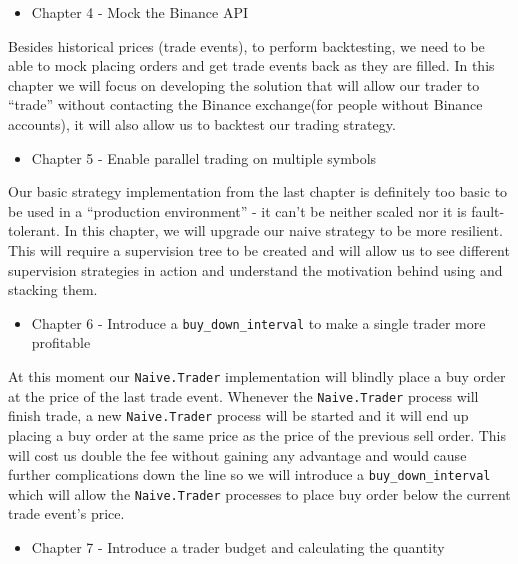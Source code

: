 \documentclass[
]{book}
\providecommand{\tightlist}{%
  \setlength{\itemsep}{0pt}\setlength{\parskip}{0pt}}
\begin{document}
\begin{itemize}
\tightlist
\item
  Chapter 4 - Mock the Binance API
\end{itemize}

Besides historical prices (trade events), to perform backtesting, we need to be able to mock placing orders and get trade events back as they are filled. In this chapter we will focus on developing the solution that will allow our trader to ``trade'' without contacting the Binance exchange(for people without Binance accounts), it will also allow us to backtest our trading strategy.

\begin{itemize}
\tightlist
\item
  Chapter 5 - Enable parallel trading on multiple symbols
\end{itemize}

Our basic strategy implementation from the last chapter is definitely too basic to be used in a ``production environment'' - it can't be neither scaled nor it is fault-tolerant. In this chapter, we will upgrade our naive strategy to be more resilient. This will require a supervision tree to be created and will allow us to see different supervision strategies in action and understand the motivation behind using and stacking them.

\begin{itemize}
\tightlist
\item
  Chapter 6 - Introduce a \texttt{buy\_down\_interval} to make a single trader more profitable
\end{itemize}

At this moment our \texttt{Naive.Trader} implementation will blindly place a buy order at the price of the last trade event. Whenever the \texttt{Naive.Trader} process will finish trade, a new \texttt{Naive.Trader} process will be started and it will end up placing a buy order at the same price as the price of the previous sell order. This will cost us double the fee without gaining any advantage and would cause further complications down the line so we will introduce a \texttt{buy\_down\_interval} which will allow the \texttt{Naive.Trader} processes to place buy order below the current trade event's price.

\begin{itemize}
\tightlist
\item
  Chapter 7 - Introduce a trader budget and calculating the quantity
\end{itemize}
\end{document}
